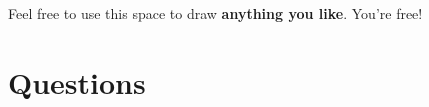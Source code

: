 \documentclass[addpoints,12pt, answers]{exam}
\begin{document}
{\small
\vqword{}
\begin{center}
\gradetable[v][questions]
\end{center}
}

\vspace{\fill}

\begin{center}
  Feel free to use this space to draw \textbf{anything you like}. You're free! \\

  \vspace{10pt}

  \fbox{\rule{6in}{0pt}\rule[-0.5ex]{0pt}{2.5in}}
\end{center}


\newpage


\section*{Questions}
\end{document}

